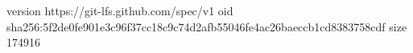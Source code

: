 version https://git-lfs.github.com/spec/v1
oid sha256:5f2de0fe901e3c96f37cc18c9c74d2afb55046fe4ac26baeccb1cd8383758cdf
size 174916
